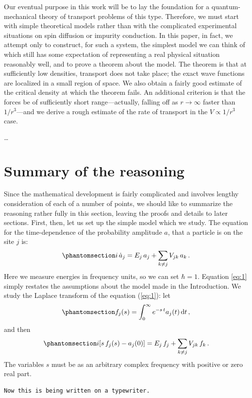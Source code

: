 \documentclass[%
	english,%
	 a4paper,%
	fleqn]{article}
\begin{document}
Our eventual purpose in this work will be to lay the foundation for a
quantum-mechanical theory of transport problems of this type. Therefore,
we must start with simple theoretical models rather than with the
complicated experimental situations on spin diffusion or impurity
conduction. In this paper, in fact, we attempt only to construct, for
such a system, the simplest model we can think of which still has some
expectation of representing a real physical situation reasonably well,
and to prove a theorem about the model. The theorem is that at
sufficiently low densities, transport does not take place; the exact
wave functions are localized in a small region of space. We also obtain
a fairly good estimate of the critical density at which the theorem
fails. An additional criterion is that the forces be of sufficiently
short range---actually, falling off as \(r \rightarrow \infty\) faster
than \(1/r^3\)---and we derive a rough estimate of the rate of transport
in the \(V \propto 1/r^3\) case.

\ldots{}

\section{Summary of the reasoning}\label{summary-of-the-reasoning}

Since the mathematical development is fairly complicated and involves
lengthy consideration of each of a number of points, we should like to
summarize the reasoning rather fully in this section, leaving the proofs
and details to later sections. First, then, let us set up the simple
model which we study. The equation for the time-dependence of the
probability amplitude \(a\), that a particle is on the site \(j\) is:
\begin{equation}\phantomsection\label{eq:1}{i \, \dot{a}_j = E_j \, a_j + \sum_{k \neq j} V_{j k} \, a_k \,.}\end{equation}
Here we measure energies in frequency units, so we can set
\(\hbar = 1\). Equation \ref{eq:1} simply restates the assumptions about
the model made in the Introduction. We study the Laplace transform of
the equation (\ref{eq:1}): let
\begin{equation}\phantomsection\label{eq:2}{ f_j(s) = \int_{0}^{\infty} e^{-s \, t} a_j(t) \dl{t} \,, }\end{equation}
and then
\begin{equation}\phantomsection\label{eq:3}{ i \left[ s \, f_j(s) - a_j(0) \right] = E_j \, f_j + \sum_{k \neq j} V_{j k} \, f_k \,.}\end{equation}
The variables \(s\) must be as an arbitrary complex frequency with
positive or zero real part.

\texttt{Now\ this\ is\ being\ written\ on\ a\ typewriter.}






\printbibliography
\end{document}
